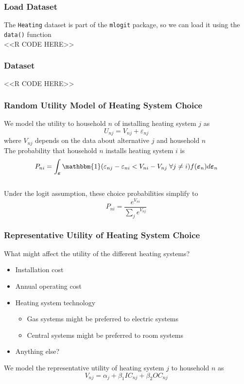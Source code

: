 \documentclass{beamer}
\begin{document}
\begin{frame}[fragile]\frametitle{Load Dataset}
    The \texttt{Heating} dataset is part of the \texttt{mlogit} package, so we can load it using the \texttt{data()} function \\
    <<R CODE HERE>>
\end{frame}

\begin{frame}[fragile]\frametitle{Dataset}
    <<R CODE HERE>>
\end{frame}

\begin{frame}\frametitle{Random Utility Model of Heating System Choice}
    We model the utility to household $n$ of installing heating system $j$ as
    $$U_{nj} = V_{nj} + \varepsilon_{nj}$$
    where $V_{nj}$ depends on the data about alternative $j$ and household $n$ \\
    \vspace{3ex}
    The probability that household $n$ installs heating system $i$ is
 	$$P_{ni} = \int_{\bm{\varepsilon}} \mathbbm{1}(\varepsilon_{nj} - \varepsilon_{ni} < V_{ni} - V_{nj} \; \forall j \neq i) f(\bm{\varepsilon}_n) d\bm{\varepsilon}_n$$ \\
 	\vspace{2ex}
  	Under the logit assumption, these choice probabilities simplify to
    $$P_{ni} = \frac{e^{V_{ni}}}{\sum_j e^{V_{nj}}}$$
\end{frame}

\begin{frame}\frametitle{Representative Utility of Heating System Choice}
	What might affect the utility of the different heating systems?
	\begin{itemize}
		\item Installation cost
		\item Annual operating cost
		\item Heating system technology
		\begin{itemize}
			\item Gas systems might be preferred to electric systems
			\item Central systems might be preferred to room systems
		\end{itemize}
		\item Anything else?
	\end{itemize}
    \vspace{3ex}
    We model the representative utility of heating system $j$ to household $n$ as
    $$V_{nj} = \alpha_j + \beta_1 IC_{nj} + \beta_2 OC_{nj}$$
\end{frame}
\end{document}
